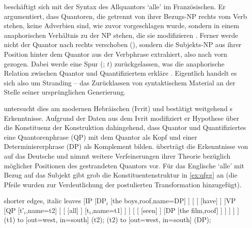 \citet{sportiche1988} beschäftigt sich mit der Syntax des Allquantors 
`alle' im Französischen. Er argumentiert, dass Quantoren, die getrennt von
ihrer Bezugs-NP rechts vom Verb stehen, keine Adverbien sind, wie zuvor
vorgeschlagen wurde, sondern in einem anaphorischen Verhältnis zu der NP
stehen, die sie modifizieren \autocite[428--433]{sportiche1988}. Ferner werde
nicht der Quantor nach rechts verschoben (), sondern die
Subjekts-NP aus ihrer Position hinter dem Quantor aus der Verbphrase
extrahiert, also nach vorn gezogen. Dabei werde eine Spur (; $t$)
zurückgelassen, was die anaphorische Relation zwischen Quantor und
Quantifiziertem erkläre \autocite[432--433]{sportiche1988}. Eigentlich handelt
es sich also um Stranding -- das Zurücklassen von syntaktischem Material an der
Stelle seiner ursprünglichen Generierung.

\citet{shlonsky1991} untersucht dies am modernen Hebräischen (Ivrit) und
bestätigt weitgehend \citeauthor{sportiche1988}s Erkenntnisse. Aufgrund der
Daten aus dem Ivrit modifiziert er  Hypothese über die
Konstituenz der Konstruktion dahingehend, dass Quantor und Quantifiziertes eine
Quantorenphrase (QP) mit dem Quantor als Kopf und einer Determiniererphrase
(DP) als Komplement bilden. \citet{merchant1996} überträgt die Erkenntnisse von
\citet{sportiche1988,shlonsky1991} auf das Deutsche und nimmt weitere
Verfeinerungen ihrer Theorie bezüglich möglicher Positionen des gestrandeten
Quantors vor. Für das Englische  `alle' mit Bezug auf das Subjekt
gibt \citet[180]{merchant1996} grob die Konstituentenstruktur in \cref{ex:qfgg}
an (die Pfeile wurden zur Verdeutlichung der postulierten Transformation
hinzugefügt).

\begin{exe}
\ex \label{ex:qfgg}
	\begin{forest} shorter edges, italic leaves
	[IP
		[DP$_i$
			[{the boys},roof,name=DP]
		]
		[
			[
				[have]
			]
			[VP
				[QP
					[t′$_i$,name=t2]
					[
						[
							[all]
						]
						[t$_i$,name=t1]
					]
				]
				[
					[
						[seen]
					]
					[DP
						[{the film},roof]
					]
				]
			]
		]
	]
	 (t1) to [out=west, in=south] (t2);
	 (t2) to [out=west, in=south] (DP);
	\end{forest}
\end{exe}

